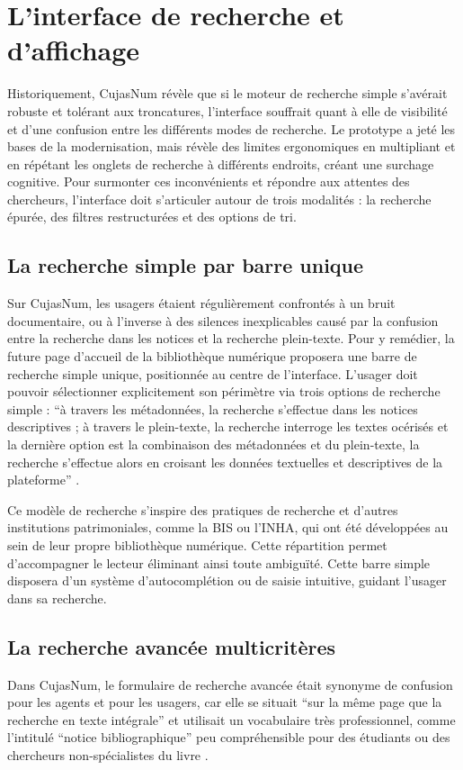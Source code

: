 \section{L'interface de recherche et d'affichage}
Historiquement, CujasNum révèle que si le moteur de recherche simple s'avérait robuste et tolérant aux troncatures, l'interface souffrait quant à elle de visibilité et d'une confusion entre les différents modes de recherche. Le prototype a jeté les bases de la modernisation, mais révèle des limites ergonomiques en multipliant et en répétant les onglets de recherche à différents endroits, créant une surchage cognitive. Pour surmonter ces inconvénients et répondre aux attentes des chercheurs, l'interface doit s'articuler autour de trois modalités : la recherche épurée, des filtres restructurées et des options de tri.

\subsection{La recherche simple par barre unique}
Sur CujasNum, les usagers étaient régulièrement confrontés à un bruit documentaire, ou à l'inverse à des silences inexplicables causé par la confusion entre la recherche dans les notices et la recherche plein-texte. Pour y remédier, la future page d'accueil de la bibliothèque numérique proposera une barre de recherche simple unique, positionnée au centre de l'interface. L'usager doit pouvoir sélectionner explicitement son périmètre via trois options de recherche simple : \enquote{à travers les métadonnées, la recherche s'effectue dans les notices descriptives ; à travers le plein-texte, la recherche interroge les textes océrisés et la dernière option est la combinaison des métadonnées et du plein-texte, la recherche s'effectue alors en croisant les données textuelles et descriptives de la plateforme} .

Ce modèle de recherche s'inspire des pratiques de recherche et d'autres institutions patrimoniales, comme la \ac{BIS} ou l'\ac{INHA}, qui ont été développées au sein de leur propre bibliothèque numérique. Cette répartition permet d'accompagner le lecteur éliminant ainsi toute ambiguïté. Cette barre simple disposera d'un système d'autocomplétion ou de saisie intuitive, guidant l'usager dans sa recherche.

\subsection{La recherche avancée multicritères}
Dans CujasNum, le formulaire de recherche avancée était synonyme de confusion pour les agents et pour les usagers, car elle se situait \enquote{sur la même page que la recherche en texte intégrale} et utilisait un vocabulaire très professionnel, comme l'intitulé \enquote{notice bibliographique} peu compréhensible pour des étudiants ou des chercheurs non-spécialistes du livre .

